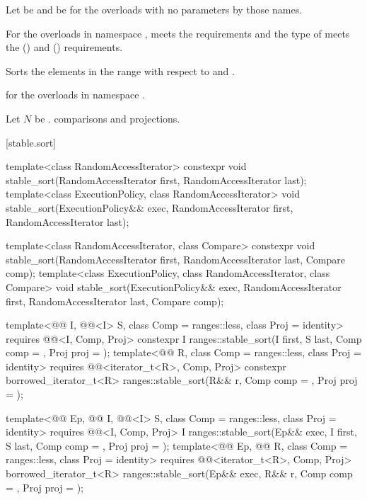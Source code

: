 \begin{itemdescr}
\pnum
Let  be 
and  be 
for the overloads with no parameters by those names.

\pnum
\expects
For the overloads in namespace ,
 meets
the  requirements and
the type of  meets
the  () and
 () requirements.

\pnum
\effects
Sorts the elements in the range 
with respect to  and .

\pnum
\returns
{} for the overloads in namespace .

\pnum
\complexity
Let $N$ be .
 comparisons and projections.
\end{itemdescr}

[stable.sort]{}

%
\begin{itemdecl}
template<class RandomAccessIterator>
  constexpr void stable_sort(RandomAccessIterator first, RandomAccessIterator last);
template<class ExecutionPolicy, class RandomAccessIterator>
  void stable_sort(ExecutionPolicy&& exec,
                   RandomAccessIterator first, RandomAccessIterator last);

template<class RandomAccessIterator, class Compare>
  constexpr void stable_sort(RandomAccessIterator first, RandomAccessIterator last,
                             Compare comp);
template<class ExecutionPolicy, class RandomAccessIterator, class Compare>
  void stable_sort(ExecutionPolicy&& exec,
                   RandomAccessIterator first, RandomAccessIterator last,
                   Compare comp);

template<@@ I, @@<I> S, class Comp = ranges::less,
         class Proj = identity>
  requires @@<I, Comp, Proj>
  constexpr I ranges::stable_sort(I first, S last, Comp comp = {}, Proj proj = {});
template<@@ R, class Comp = ranges::less, class Proj = identity>
  requires @@<iterator_t<R>, Comp, Proj>
  constexpr borrowed_iterator_t<R>
    ranges::stable_sort(R&& r, Comp comp = {}, Proj proj = {});

template<@@ Ep, @@ I, @@<I> S,
         class Comp = ranges::less, class Proj = identity>
  requires @@<I, Comp, Proj>
  I ranges::stable_sort(Ep&& exec, I first, S last, Comp comp = {}, Proj proj = {});
template<@@ Ep, @@ R, class Comp = ranges::less,
         class Proj = identity>
  requires @@<iterator_t<R>, Comp, Proj>
  borrowed_iterator_t<R>
    ranges::stable_sort(Ep&& exec, R&& r, Comp comp = {}, Proj proj = {});
\end{itemdecl}

